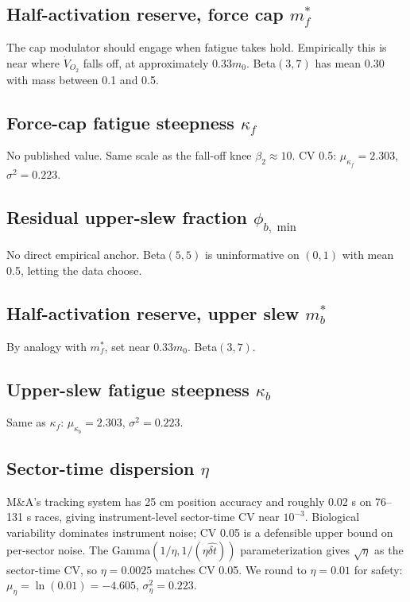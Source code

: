 \documentclass[11pt]{article}
\begin{document}
\subsection*{Half-activation reserve, force cap $m_f^*$}
The cap modulator should engage when fatigue takes hold. Empirically this is near where $\dot V_{O_2}$ falls off, at approximately $0.33 m_0$. Beta$(3, 7)$ has mean 0.30 with mass between 0.1 and 0.5.

\subsection*{Force-cap fatigue steepness $\kappa_f$}
No published value. Same scale as the fall-off knee $\beta_2 \approx 10$. CV 0.5: $\mu_{\kappa_f} = 2.303$, $\sigma^2 = 0.223$.

\subsection*{Residual upper-slew fraction $\phi_{b,\min}$}
No direct empirical anchor. Beta$(5, 5)$ is uninformative on $(0, 1)$ with mean 0.5, letting the data choose.

\subsection*{Half-activation reserve, upper slew $m_b^*$}
By analogy with $m_f^*$, set near $0.33 m_0$. Beta$(3, 7)$.

\subsection*{Upper-slew fatigue steepness $\kappa_b$}
Same as $\kappa_f$: $\mu_{\kappa_b} = 2.303$, $\sigma^2 = 0.223$.

\subsection*{Sector-time dispersion $\eta$}
M\&A's tracking system has 25 cm position accuracy and roughly 0.02 s on 76–131 s races, giving instrument-level sector-time CV near $10^{-3}$. Biological variability dominates instrument noise; CV 0.05 is a defensible upper bound on per-sector noise. The Gamma$(1/\eta, 1/(\eta \hat{\delta t}))$ parameterization gives $\sqrt\eta$ as the sector-time CV, so $\eta = 0.0025$ matches CV 0.05. We round to $\eta = 0.01$ for safety: $\mu_\eta = \ln(0.01) = -4.605$, $\sigma_\eta^2 = 0.223$.
\end{document}

